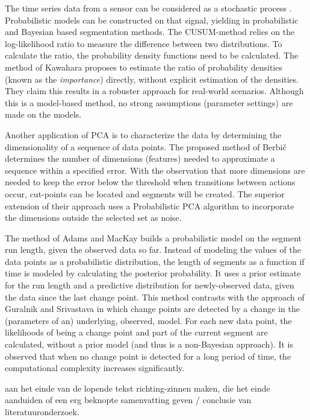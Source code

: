 The time series data from a sensor can be considered as a stochastic process .
Probabilistic models can be constructed on that signal, yielding in probabilistic and Bayesian based segmentation methods.
The CUSUM-method relies on the log-likelihood ratio to measure the difference between two distributions.
To calculate the ratio, the probability density functions need to be calculated.
The method of Kawahara \etal \cite{kawahara2009change} proposes to estimate the ratio of probability densities (known as the \emph{importance}) directly, without explicit estimation of the densities.
They claim this results in a robuster approach for real-world scenarios.
Although this is a model-based method, no strong assumptions (parameter settings) are made on the models.

Another application of PCA is to characterize the data by determining the dimensionality of a sequence of data points.
The proposed method of Berbi\v{c} \etal \cite{barbivc2004segmenting} determines the number of dimensions (features) needed to approximate a sequence within a specified error.
With the observation that more dimensions are needed to keep the error below the threshold when transitions between actions occur, cut-points can be located and segments will be created.
The superior extension of their approach uses a Probabilistic PCA algorithm to incorporate the dimensions outside the selected set as noise.

The method of Adams and MacKay \cite{adams2007bayesian} builds a probabilistic model on the segment run length, given the observed data so far.
Instead of modeling the values of the data points as a probabilistic distribution, the length of segments as a function if time is modeled by calculating the posterior probability.
It uses a prior estimate for the run length and a predictive distribution for newly-observed data, given the data since the last change point.
This method contrasts with the approach of Guralnik and Srivastava \cite{guralnik1999event} in which change points are detected by a change in the (parameters of an) underlying, observed, model.
For each new data point, the likelihoods of being a change point and part of the current segment are calculated, without a prior model (and thus is a non-Bayesian approach).
It is observed that when no change point is detected for a long period of time, the computational complexity increases significantly.


 aan het einde van de lopende tekst richting-zinnen maken, die het einde aanduiden of een erg beknopte samenvatting geven / conclusie van literatuuronderzoek.